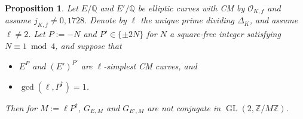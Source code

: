 \documentclass[11pt]{amsart}
\newtheorem{proposition}[defn]{Proposition}
\theoremstyle{definition}
\newcommand{\Q}{\mathbb{Q}}
\newcommand{\Z}{\mathbb{Z}}
\newcommand{\Of}{\mathcal{O}_{K,f}}
\newcommand{\GL}{\operatorname{GL}}
\begin{document}
\begin{proposition}\label{prop-notconjugate-level4and8}
    Let $E/\Q$ and $E'/\Q$ be elliptic curves with CM by $\Of$ and assume $j_{K, f} \neq 0, 1728$. Denote by $\ell$ the unique prime dividing $\Delta_K$, and assume $\ell \neq 2$.    Let $P := -N$ and $P' \in \{\pm 2N\}$ for $N$ a square-free integer satisfying $N \equiv 1 \bmod 4$, and suppose that 
    \begin{itemize}
        \item $E^P$ and $(E')^{P'}$ are $\ell$-simplest CM curves, and 
        \item $\gcd(\ell, P^{\dagger}) = 1$.
    \end{itemize}
Then for $M := \ell P^{\dagger}$, $G_{E, M }$ and $G_{E', M}$ are not conjugate in $\GL(2, \Z/ M\Z)$.
\end{proposition}
\end{document}
